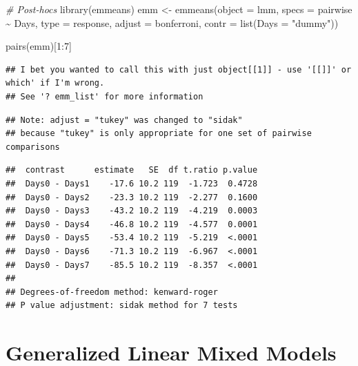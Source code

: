 \documentclass[
]{book}
\newenvironment{Shaded}{\begin{snugshade}}{\end{snugshade}}
\newcommand{\AttributeTok}[1]{\textcolor[rgb]{0.77,0.63,0.00}{#1}}
\newcommand{\CommentTok}[1]{\textcolor[rgb]{0.56,0.35,0.01}{\textit{#1}}}
\newcommand{\DecValTok}[1]{\textcolor[rgb]{0.00,0.00,0.81}{#1}}
\newcommand{\FunctionTok}[1]{\textcolor[rgb]{0.00,0.00,0.00}{#1}}
\newcommand{\NormalTok}[1]{#1}
\newcommand{\OtherTok}[1]{\textcolor[rgb]{0.56,0.35,0.01}{#1}}
\newcommand{\SpecialCharTok}[1]{\textcolor[rgb]{0.00,0.00,0.00}{#1}}
\newcommand{\StringTok}[1]{\textcolor[rgb]{0.31,0.60,0.02}{#1}}
\begin{document}
\begin{Shaded}
\begin{Highlighting}[]
\CommentTok{\# Post{-}hocs}
\FunctionTok{library}\NormalTok{(emmeans)}
\NormalTok{emm }\OtherTok{\textless{}{-}} \FunctionTok{emmeans}\NormalTok{(}\AttributeTok{object =}\NormalTok{ lmm,}
                     \AttributeTok{specs =}\NormalTok{ pairwise }\SpecialCharTok{\textasciitilde{}}\NormalTok{ Days,}
                     \AttributeTok{type =} \StringTok{\textquotesingle{}response\textquotesingle{}}\NormalTok{,}
                     \AttributeTok{adjust =} \StringTok{\textquotesingle{}bonferroni\textquotesingle{}}\NormalTok{, }
               \AttributeTok{contr =} \FunctionTok{list}\NormalTok{(}\AttributeTok{Days =} \StringTok{"dummy"}\NormalTok{))}


\FunctionTok{pairs}\NormalTok{(emm)[}\DecValTok{1}\SpecialCharTok{:}\DecValTok{7}\NormalTok{]}
\end{Highlighting}
\end{Shaded}

\begin{verbatim}
## I bet you wanted to call this with just object[[1]] - use '[[]]' or which' if I'm wrong.
## See '? emm_list' for more information
\end{verbatim}

\begin{verbatim}
## Note: adjust = "tukey" was changed to "sidak"
## because "tukey" is only appropriate for one set of pairwise comparisons
\end{verbatim}

\begin{verbatim}
##  contrast      estimate   SE  df t.ratio p.value
##  Days0 - Days1    -17.6 10.2 119  -1.723  0.4728
##  Days0 - Days2    -23.3 10.2 119  -2.277  0.1600
##  Days0 - Days3    -43.2 10.2 119  -4.219  0.0003
##  Days0 - Days4    -46.8 10.2 119  -4.577  0.0001
##  Days0 - Days5    -53.4 10.2 119  -5.219  <.0001
##  Days0 - Days6    -71.3 10.2 119  -6.967  <.0001
##  Days0 - Days7    -85.5 10.2 119  -8.357  <.0001
## 
## Degrees-of-freedom method: kenward-roger 
## P value adjustment: sidak method for 7 tests
\end{verbatim}

\hypertarget{generalized-linear-mixed-models}{%
\section{Generalized Linear Mixed Models}\label{generalized-linear-mixed-models}}
\end{document}
